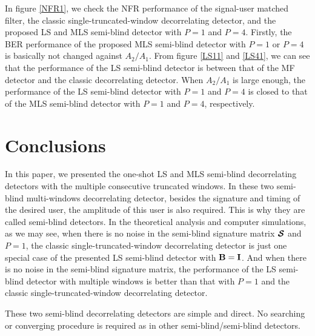 \documentclass[a4paper,11pt,fleqn]{article}
\newcommand{\bI}{{\bf I}}
\newcommand{\bB}{{\bf B}}
\newcommand{\bcS}{{\mbox {\boldmath ${\cal S}$}}}
\begin{document}
In figure \ref{NFR1}, we check the NFR performance of the
signal-user matched filter, the classic single-truncated-window
decorrelating detector, and the proposed LS  and MLS semi-blind
detector with $P=1$ and $P=4$. Firstly, the BER performance of the
proposed MLS semi-blind detector with $P=1$ or $P=4$ is basically
not changed against $A_2/A_1$. From figure \ref{LS11} and
\ref{LS41}, we can see that the performance of the LS semi-blind
detector is between that of the MF detector and the classic
decorrelating detector. When $A_2/A_1$ is large enough, the
performance of the LS semi-blind detector with $P=1$ and $P=4$ is
closed to that of the MLS semi-blind detector with $P=1$ and
$P=4$, respectively.

\section{Conclusions}

In this paper, we presented the one-shot LS and MLS semi-blind
decorrelating detectors with the multiple consecutive truncated
windows. In these two semi-blind multi-windows decorrelating
detector, besides the signature and timing of the desired user,
the amplitude of this user is also required. This is why they are
called semi-blind detectors. In the theoretical analysis and
computer simulations, as we may see, when there is no noise in the
semi-blind signature matrix $\bcS$ and $P=1$, the classic
single-truncated-window decorrelating detector is just one special
case of the presented LS semi-blind detector with $\bB=\bI$. And
when there is no noise in the semi-blind signature matrix, the
performance of the LS semi-blind detector with multiple windows is
better than that with $P=1$ and the classic
single-truncated-window decorrelating detector.

These two semi-blind decorrelating detectors are simple and
direct. No searching or converging procedure is required as in
other semi-blind/semi-blind detectors.



\end{document}
